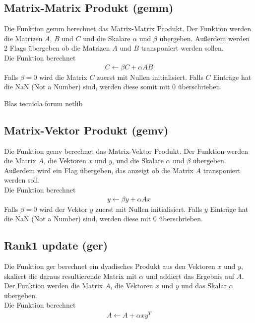 \subsection{Matrix-Matrix Produkt (gemm)}
Die Funktion \glqq gemm\grqq{} berechnet das Matrix-Matrix Produkt.
Der Funktion werden die Matrizen $A$, $B$ und $C$ und die Skalare $\alpha$ und $\beta$ übergeben. Außerdem werden 2 Flags übergeben ob die Matrizen $A$ und $B$ transponiert werden sollen.\\
Die Funktion berechnet
\begin{align}
	C \leftarrow \beta  C + \alpha  A  B
\end{align}
Falls $\beta = 0$ wird die Matrix $C$ zuerst mit Nullen initialisiert. Falls $C$ Einträge hat die NaN (Not a Number) sind, werden diese somit mit 0 überschrieben.

\cite{blast}
Blas tecnicla forum netlib

\subsection{Matrix-Vektor Produkt (gemv)}
Die Funktion \glqq gemv\grqq{} berechnet das Matrix-Vektor Produkt.
Der Funktion werden die Matrix $A$, die Vektoren $x$ und $y$, und die Skalare $\alpha$ und $\beta$ übergeben. Außerdem wird ein Flag übergeben, das anzeigt ob die Matrix $A$ transponiert werden soll.\\
Die Funktion berechnet
\begin{align}
y \leftarrow \beta  y + \alpha A x 
\end{align}
Falls $\beta = 0$ wird der Vektor $y$ zuerst mit Nullen initialisiert. Falls $y$ Einträge hat die NaN (Not a Number) sind, werden diese mit 0 überschrieben.

\subsection{Rank1 update (ger)}
Die Funktion \glqq ger\grqq{}  berechnet ein dyadisches Produkt aus den Vektoren $x$ und $y$, skaliert die daraus resultierende Matrix mit $\alpha$ und addiert das Ergebnis auf $A$.\\
Der Funktion werden die Matrix $A$, die Vektoren $x$ und $y$ und das Skalar $\alpha$ übergeben.\\
Die Funktion berechnet
\begin{align}
A \leftarrow A + \alpha  x y^T
\end{align}

